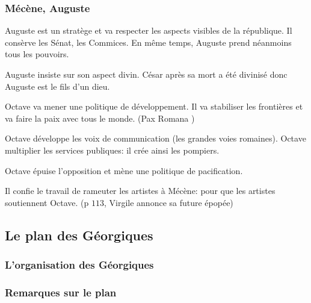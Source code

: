 \documentclass[a4paper, 11pt, hidelinks]{article}
\begin{document}
\subsubsection{Mécène, Auguste}

Auguste est un stratège et va respecter les aspects visibles de la république. Il consèrve les Sénat, les Commices. En même temps, Auguste prend
néanmoins tous les pouvoirs.


Auguste insiste sur son aspect divin. César après sa mort a été divinisé donc Auguste est le fils d'un dieu.


Octave va mener une politique de développement. Il va stabiliser les frontières et va faire la paix avec tous le monde. (\og Pax Romana \fg)


Octave développe les voix de communication (les grandes voies romaines). Octave multiplier les services publiques: il crée ainsi les pompiers.


Octave épuise l'opposition et mène une politique de pacification.


Il confie le travail de rameuter les artistes à Mécène: pour que les artistes soutiennent Octave. (p $113$, Virgile annonce sa future épopée)



\subsection{Le plan des Géorgiques}

\subsubsection{L'organisation des Géorgiques}






\subsubsection{Remarques sur le plan}
\end{document}
